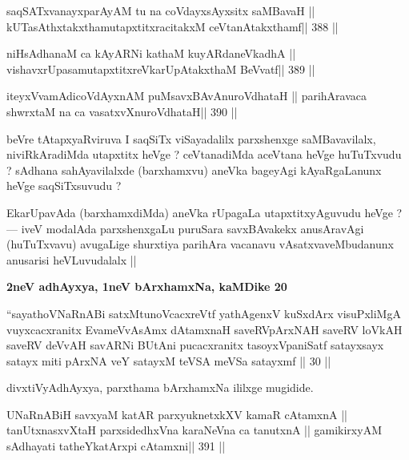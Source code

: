\begin{shl}
saqSATxvanayxparAyAM tu na coVdayxsAyxsitx saMBavaH ||
kUTasAthxtakxthamutapxtitxracitakxM ceVtanAtakxthamf\hfill || 388 ||
\end{shl}

\begin{shl}
niHsAdhanaM ca kAyARNi kathaM kuyARdaneVkadhA ||
vishavxrUpasamutapxtitxreVkarUpAtakxthaM BeVvatf\hfill || 389 ||
\end{shl}

\begin{shl}
iteyxVvamAdicoVdAyxnAM puMsavxBAvAnuroVdhataH ||
parihAravaca shwrxtaM na ca vasatxvXnuroVdhataH\hfill || 390 ||
\end{shl}

\begin{artha}
beVre tAtapxyaRviruva I saqSiTx viSayadalilx parxshenxge saMBavavilalx, niviRkAradiMda utapxtitx heVge ? ceVtanadiMda aceVtana heVge huTuTxvudu ? sAdhana sahAyavilalxde (barxhamxvu) aneVka bageyAgi kAyaRgaLanunx heVge saqSiTxsuvudu ?
\end{artha}

\begin{artha}
EkarUpavAda (barxhamxdiMda) aneVka rUpagaLa utapxtitxyAguvudu heVge ? --- iveV modalAda parxshenxgaLu puruSara savxBAvakekx anusAravAgi (huTuTxvavu) avugaLige shurxtiya parihAra vacanavu vAsatxvaveMbudanunx anusarisi heVLuvudalalx ||
\end{artha}

\begin{center}
{\large\bf 2neV adhAyxya, 1neV bArxhamxNa, kaMDike 20}
\end{center}

\begin{shl}
``sayathoVNaRnABi satxMtunoVcacxreVtf
yathAgenxV kuSxdArx visuPxliMgA vuyxcacxranitx
EvameVvAsAmx dAtamxnaH saveRVpArxNAH
saveRV loVkAH saveRV deVvAH savARNi
BUtAni pucacxranitx tasoyxVpaniSatf satayxsayx
satayx miti pArxNA veY satayxM teVSA meVSa satayxmf || 30 ||
\end{shl}

\begin{artha}
divxtiVyAdhAyxya, parxthama bArxhamxNa ililxge mugidide.
\end{artha}

\begin{shl}
UNaRnABiH savxyaM katAR parxyuknetxkXV kamaR cA\s\s tamxnA ||
tanUtxnasxvXtaH parxsidedhxVna karaNeVna ca tanutxnA ||
gamikirxyAM sAdhayati tatheYkatArxpi cA\s\s tamxni\hfill || 391 ||
\end{shl}

